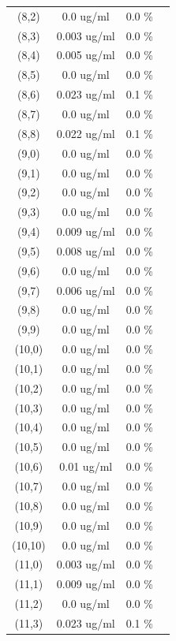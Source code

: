 \documentclass{article}
\begin{document}
\begin{tabular}{c c c c}
(8,2)&        0.0 ug/ml        &0.0 \%\\
(8,3)&        0.003 ug/ml        &0.0 \%\\
(8,4)&        0.005 ug/ml        &0.0 \%\\
(8,5)&        0.0 ug/ml        &0.0 \%\\
(8,6)&        0.023 ug/ml        &0.1 \%\\
(8,7)&        0.0 ug/ml        &0.0 \%\\
(8,8)&        0.022 ug/ml        &0.1 \%\\
(9,0)&        0.0 ug/ml        &0.0 \%\\
(9,1)&        0.0 ug/ml        &0.0 \%\\
(9,2)&        0.0 ug/ml        &0.0 \%\\
(9,3)&        0.0 ug/ml        &0.0 \%\\
(9,4)&        0.009 ug/ml        &0.0 \%\\
(9,5)&        0.008 ug/ml        &0.0 \%\\
(9,6)&        0.0 ug/ml        &0.0 \%\\
(9,7)&        0.006 ug/ml        &0.0 \%\\
(9,8)&        0.0 ug/ml        &0.0 \%\\
(9,9)&        0.0 ug/ml        &0.0 \%\\
(10,0)&        0.0 ug/ml        &0.0 \%\\
(10,1)&        0.0 ug/ml        &0.0 \%\\
(10,2)&        0.0 ug/ml        &0.0 \%\\
(10,3)&        0.0 ug/ml        &0.0 \%\\
(10,4)&        0.0 ug/ml        &0.0 \%\\
(10,5)&        0.0 ug/ml        &0.0 \%\\
(10,6)&        0.01 ug/ml        &0.0 \%\\
(10,7)&        0.0 ug/ml        &0.0 \%\\
(10,8)&        0.0 ug/ml        &0.0 \%\\
(10,9)&        0.0 ug/ml        &0.0 \%\\
(10,10)&        0.0 ug/ml        &0.0 \%\\
(11,0)&        0.003 ug/ml        &0.0 \%\\
(11,1)&        0.009 ug/ml        &0.0 \%\\
(11,2)&        0.0 ug/ml        &0.0 \%\\
(11,3)&        0.023 ug/ml        &0.1 \%\\

\end{tabular}
\end{document}
